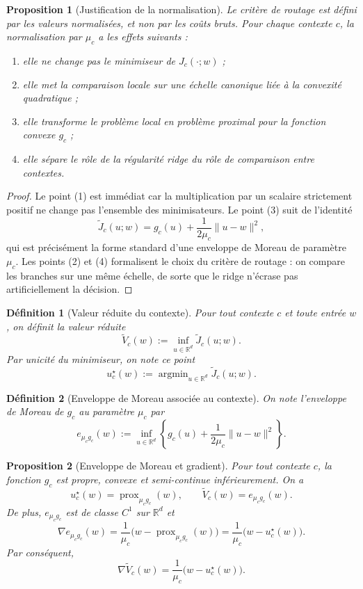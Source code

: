 \documentclass[11pt,a4paper]{article}
\newtheorem{definition}{Définition}[section]
\newtheorem{proposition}{Proposition}[section]
\DeclareMathOperator{\prox}{prox}
\DeclareMathOperator{\argmin}{argmin}
\newcommand{\R}{\mathbb R}
\begin{document}
\begin{proposition}[Justification de la normalisation]
Le critère de routage est défini par les valeurs normalisées, et non par les coûts bruts. Pour chaque contexte \(c\), la normalisation par \(\mu_c\) a les effets suivants :
\begin{enumerate}[leftmargin=2em]
\item elle ne change pas le minimiseur de \(J_c(\cdot;w)\) ;
\item elle met la comparaison locale sur une échelle canonique liée à la convexité quadratique ;
\item elle transforme le problème local en problème proximal pour la fonction convexe \(g_c\) ;
\item elle sépare le rôle de la régularité ridge du rôle de comparaison entre contextes.
\end{enumerate}
\end{proposition}

\begin{proof}
Le point (1) est immédiat car la multiplication par un scalaire strictement positif ne change pas l'ensemble des minimisateurs. Le point (3) suit de l'identité
\[
\widetilde J_c(u;w)=g_c(u)+\frac{1}{2\mu_c}\|u-w\|^2,
\]
qui est précisément la forme standard d'une enveloppe de Moreau de paramètre \(\mu_c\). Les points (2) et (4) formalisent le choix du critère de routage : on compare les branches sur une même échelle, de sorte que le ridge n'écrase pas artificiellement la décision.
\end{proof}

\begin{definition}[Valeur réduite du contexte]
Pour tout contexte \(c\) et toute entrée \(w\), on définit la valeur réduite
\[
\widetilde V_c(w):=\inf_{u\in\R^d}\widetilde J_c(u;w).
\]
Par unicité du minimiseur, on note ce point
\[
u_c^\star(w):=\argmin_{u\in\R^d}\widetilde J_c(u;w).
\]
\end{definition}

\begin{definition}[Enveloppe de Moreau associée au contexte]
On note l'enveloppe de Moreau de \(g_c\) au paramètre \(\mu_c\) par
\[
e_{\mu_c g_c}(w):=\inf_{u\in\R^d}\left\{g_c(u)+\frac{1}{2\mu_c}\|u-w\|^2\right\}.
\]
\end{definition}

\begin{proposition}[Enveloppe de Moreau et gradient]
Pour tout contexte \(c\), la fonction \(g_c\) est propre, convexe et semi-continue inférieurement. On a
\[
u_c^\star(w)=\prox_{\mu_c g_c}(w),
\qquad
\widetilde V_c(w)=e_{\mu_c g_c}(w).
\]
De plus, \(e_{\mu_c g_c}\) est de classe \(C^1\) sur \(\R^d\) et
\[
\nabla e_{\mu_c g_c}(w)=\frac{1}{\mu_c}\bigl(w-\prox_{\mu_c g_c}(w)\bigr)
=\frac{1}{\mu_c}\bigl(w-u_c^\star(w)\bigr).
\]
Par conséquent,
\[
\nabla \widetilde V_c(w)=\frac{1}{\mu_c}\bigl(w-u_c^\star(w)\bigr).
\]
\end{proposition}
\end{document}
